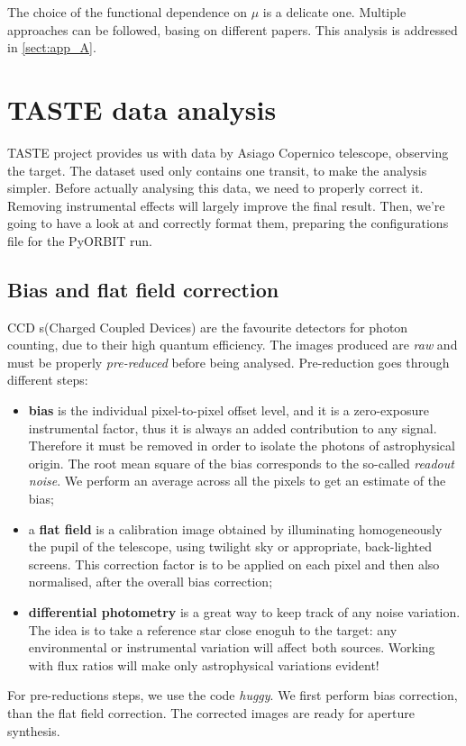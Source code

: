 \documentclass[a4paper,11pt,twocolumn]{article}
\begin{document}
The choice of the functional dependence on $\mu$ is a delicate one. Multiple 
approaches can be followed, basing on different papers. This analysis is 
addressed in \ref{sect:app_A}.


\section{TASTE data analysis}

TASTE project provides us with data by Asiago Copernico telescope, observing the target. 
The dataset used only contains one transit, to make the analysis simpler.
Before actually analysing this data, we need to properly correct it. Removing 
instrumental effects will largely improve the final result.
Then, we're going to have a look at and correctly format them, preparing 
the configurations file for the PyORBIT run. 


\subsection{Bias and flat field correction}
CCD s(Charged Coupled Devices) are the favourite detectors for photon counting, 
due to their high quantum efficiency. The images produced are \textit{raw}
and must be properly \textit{pre-reduced} before being analysed. Pre-reduction 
goes through different steps:
\begin{itemize}
    \item \textbf{bias} is the
    individual pixel-to-pixel offset level, and it is a zero-exposure instrumental 
    factor, thus it is always an added contribution to any signal. Therefore it must 
    be removed in order to isolate the photons of astrophysical origin. The root mean square 
    of the bias corresponds to the so-called \textit{readout noise}. We perform an 
    average across all the pixels to get an estimate of the bias;
    \item a \textbf{flat field} is a calibration image obtained by illuminating
    homogeneously the pupil of the telescope, using twilight sky or appropriate, 
    back-lighted screens. This correction factor is to be applied on each pixel and 
    then also normalised, after the overall bias correction;
    \item \textbf{differential photometry} is a great way to keep track of any noise
    variation. The idea is to take a reference star close enoguh to the target: any 
    environmental or instrumental variation will affect both sources. Working with 
    flux ratios will make only astrophysical variations evident!
\end{itemize}
For pre-reductions steps, we use the code \textit{huggy}. We first perform bias
correction, than the flat field correction. The corrected images are ready for 
aperture synthesis.
\end{document}
